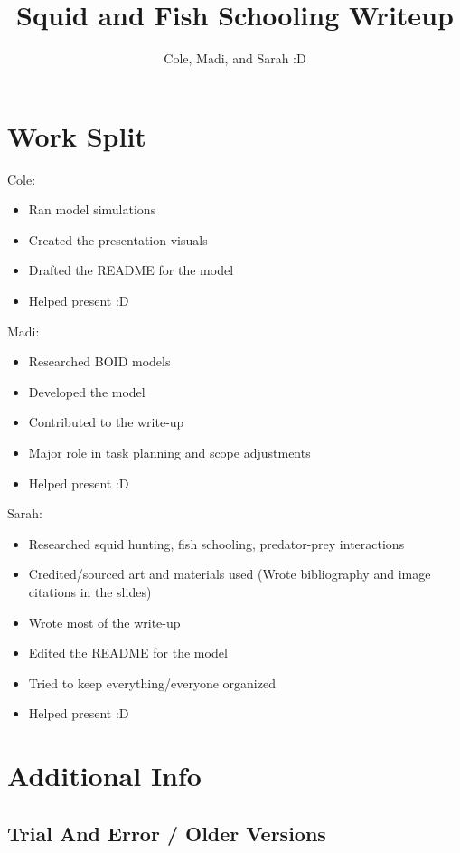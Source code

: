 \documentclass[12pt]{article}
\begin{document}
\title{Squid and Fish Schooling Writeup}
\author{Cole, Madi, and Sarah :D}
\maketitle

\section{Work Split}
Cole:
\begin{itemize}
    \item Ran model simulations
    \item Created the presentation visuals
    \item Drafted the README for the model
    \item Helped present :D
\end{itemize}
Madi:
\begin{itemize}
    \item Researched BOID models
    \item Developed the model
    \item Contributed to the write-up
    \item Major role in task planning and scope adjustments
    \item Helped present :D
\end{itemize}
Sarah:
\begin{itemize}
    \item Researched squid hunting, fish schooling, predator-prey interactions
    \item Credited/sourced art and materials used (Wrote bibliography and image citations in the slides)
    \item Wrote most of the write-up
    \item Edited the README for the model
    \item Tried to keep everything/everyone organized
    \item Helped present :D
\end{itemize}

\section{Additional Info}
\subsection{Trial And Error / Older Versions}
\end{document}
